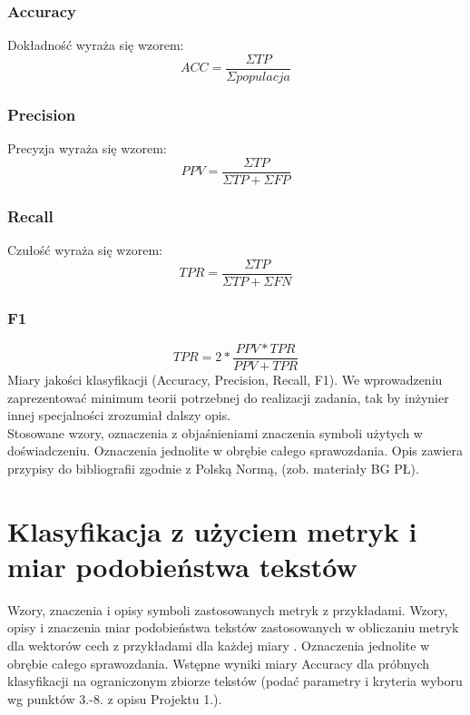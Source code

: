 \documentclass{classrep}
\begin{document}
\subsubsection{Accuracy}
Dokładność wyraża się wzorem:
\begin{equation}
ACC=\frac{\Sigma TP}{\Sigma populacja} \label{eq:eps}
\end{equation}
\subsubsection{Precision}
Precyzja wyraża się wzorem:
\begin{equation}
PPV=\frac{\Sigma TP}{\Sigma TP + \Sigma FP} \label{eq:eps}
\end{equation}
\subsubsection{Recall}
Czułość wyraża się wzorem:
\begin{equation}
TPR=\frac{\Sigma TP}{\Sigma TP + \Sigma FN} \label{eq:eps}
\end{equation}
\subsubsection{F1}
\begin{equation}
TPR=2*\frac{PPV*TPR}{PPV + TPR} \label{eq:eps}
\end{equation}
Miary jakości klasyfikacji (Accuracy, Precision,
Recall, F1). We wprowadzeniu zaprezentować minimum teorii potrzebnej do realizacji
zadania, tak by inżynier innej specjalności zrozumiał dalszy opis.\\
\indent Stosowane wzory, oznaczenia z objaśnieniami znaczenia symboli użytych w
doświadczeniu. Oznaczenia jednolite w obrębie całego sprawozdania.  Opis zawiera przypisy do bibliografii zgodnie z
Polską Normą, (zob. materiały BG PŁ).\\


\section{Klasyfikacja z użyciem metryk i miar podobieństwa tekstów}
Wzory, znaczenia i opisy symboli zastosowanych metryk z
przykładami. Wzory, opisy i znaczenia miar
podobieństwa tekstów zastosowanych w obliczaniu metryk dla wektorów cech z
przykładami dla każdej miary \cite{niewiadomski08}.  Oznaczenia jednolite w obrębie całego sprawozdania.  Wstępne wyniki miary Accuracy dla próbnych klasyfikacji na ograniczonym zbiorze tekstów (podać parametry i kryteria
wyboru wg punktów 3.-8. z opisu Projektu 1.). \\ 
\end{document}
